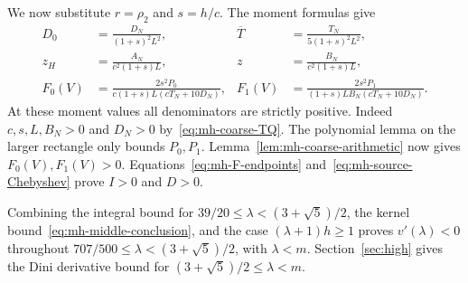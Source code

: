 We now substitute $r=\rho_2$ and $s=h/c$. The moment formulas give
\begin{align*}
 D_0&=\frac{D_N}{(1+s)^2L^2},&
 \overline T&=\frac{T_N}{5(1+s)^2L^2},\\
 z_H&=\frac{A_N}{c^2(1+s)L},&
 z&=\frac{B_N}{c^2(1+s)L},\\
 F_0(V)&=\frac{2s^2P_0}{c(1+s)L(cT_N+10D_N)},&
 F_1(V)&=\frac{2s^2P_1}{(1+s)LB_N(cT_N+10D_N)}.
\end{align*}
At these moment values all denominators are strictly positive. Indeed $c,s,L,B_N>0$ and $D_N>0$ by~\eqref{eq:mh-coarse-TQ}. The polynomial lemma on the larger rectangle only bounds $P_0,P_1$. Lemma~\ref{lem:mh-coarse-arithmetic} now gives $F_0(V),F_1(V)>0$. Equations~\eqref{eq:mh-F-endpoints} and~\eqref{eq:mh-source-Chebyshev} prove $I>0$ and $D>0$.

Combining the integral bound for $39/20\le\lambda<(3+\sqrt5)/2$, the kernel bound~\eqref{eq:mh-middle-conclusion}, and the case $(\lambda+1)h\ge1$ proves $v'(\lambda)<0$ throughout $707/500\le\lambda<(3+\sqrt5)/2$, with $\lambda<m$. Section~\ref{sec:high} gives the Dini derivative bound for $(3+\sqrt5)/2\le\lambda<m$.
